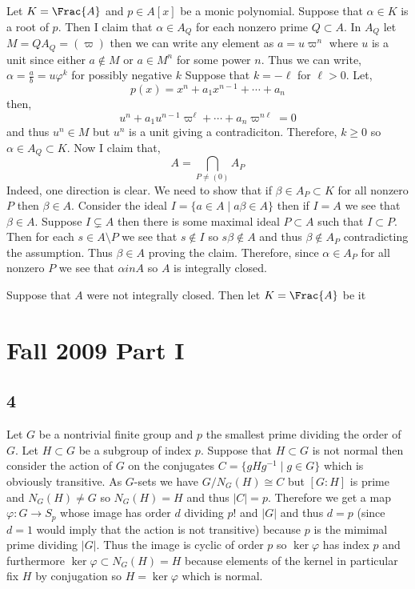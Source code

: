 \documentclass[12pt]{article}
\begin{document}
Let $K = \Frac{A}$ and $p \in A[x]$ be a monic polynomial. Suppose that $\alpha \in K$ is a root of $p$. Then I claim that $\alpha \in A_Q$ for each nonzero prime $Q \subset A$. In $A_Q$ let $M = Q A_Q = (\varpi)$ then we can write any element as $a = u \varpi^n$ where $u$ is a unit since either $a \notin M$ or $a \in M^n$ for some power $n$. Thus we can write, $\alpha = \frac{a}{b} = u \varphi^{k}$ for possibly negative $k$ Suppose that $k = -\ell$ for $\ell > 0$. Let,
\[ p(x) = x^n + a_1 x^{n-1} + \cdots + a_n \]
then,
\[ u^n + a_1 u^{n-1} \varpi^\ell + \cdots + a_n \varpi^{n \ell} = 0 \]
and thus $u^n \in M$ but $u^n$ is a unit giving a contradiciton. Therefore, $k \ge 0$ so $\alpha \in A_Q \subset K$. Now I claim that,
\[ A = \bigcap_{P \neq (0)} A_P \]
Indeed, one direction is clear. We need to show that if $\beta \in A_P \subset K$ for all nonzero $P$ then $\beta \in A$. Consider the ideal $I = \{ a \in A \mid a \beta \in A \}$ then if $I = A$ we see that $\beta \in A$. Suppose $I \subsetneq A$ then there is some maximal ideal $P \subset A$ such that $I \subset P$. Then for each $s \in A \setminus P$ we see that $s \notin I$ so $s \beta \notin A$ and thus $\beta \notin A_P$ contradicting the assumption. Thus $\beta \in A$ proving the claim. Therefore, since $\alpha \in A_P$ for all nonzero $P$ we see that $\alpha in A$ so $A$ is integrally closed.

Suppose that $A$ were not integrally closed. Then let $K = \Frac{A}$ be it

\section{Fall 2009 Part I}

\subsection{4}

Let $G$ be a nontrivial finite group and $p$ the smallest prime dividing the order of $G$. Let $H \subset G$ be a subgroup of index $p$. Suppose that $H \subset G$ is not normal then consider the action of $G$ on the conjugates $C = \{ g H g^{-1} \mid g \in G \}$ which is obviously transitive. As $G$-sets we have $G/N_G(H) \cong C$ but $[G : H]$ is prime and $N_G(H) \neq G$ so $N_G(H) = H$ and thus $|C| = p$. Therefore we get a map $\varphi : G \to S_p$ whose image has order $d$ dividing $p!$ and $|G|$ and thus $d = p$ (since $d = 1$ would imply that the action is not transitive) because $p$ is the mimimal prime dividing $|G|$. Thus the image is cyclic of order $p$ so $\ker{\varphi}$ has index $p$ and furthermore $\ker{\varphi} \subset N_G(H) = H$ because elements of the kernel in particular fix $H$ by conjugation so $H = \ker{\varphi}$ which is normal. 
\end{document}
